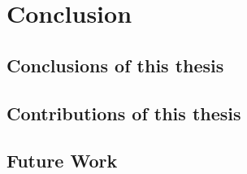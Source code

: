 
\chapter{Conclusion}

\section{Conclusions of this thesis}

%
\section{Contributions of this thesis}

\section{Future Work}
